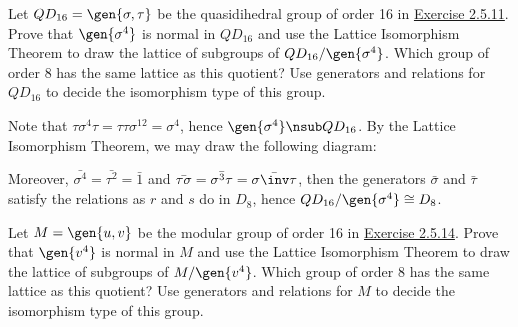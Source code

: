 \begin{exercise}\label{ex3.3.5}
    Let $QD_{16} = \gen{\sigma, \tau}$ be the quasidihedral group of order 16 in \hyperref[ex2.5.11]{Exercise 2.5.11}. Prove that $\gen{\sigma^4}$ is normal in $QD_{16}$ and use the Lattice Isomorphism Theorem to draw the lattice of subgroups of $QD_{16}/\gen{\sigma^4}$. Which group of order 8 has the same lattice as this quotient? Use generators and relations for $QD_{16}$ to decide the isomorphism type of this group.
\end{exercise}

\begin{sol}
    Note that $\tau\sigma^4\tau = \tau\tau\sigma^{12} = \sigma^4$, hence $\gen{\sigma^4} \nsub QD_{16}$. By the Lattice Isomorphism Theorem, we may draw the following diagram:
    \begin{center}
    \end{center}
    Moreover, $\bar{\sigma^4} = \bar{\tau^2} = \bar 1$ and $\bar{\tau\sigma} = \bar{\sigma^3\tau} = \bar{\sigma\inv\tau}$, then the generators $\bar\sigma$ and $\bar\tau$ satisfy the relations as $r$ and $s$ do in $D_8$, hence $QD_{16}/\gen{\sigma^4} \cong D_8$.
\end{sol}

\begin{exercise}\label{ex3.3.6}
    Let $M = \gen{u, v}$ be the modular group of order 16 in \hyperref[ex2.5.14]{Exercise 2.5.14}. Prove that $\gen{v^4}$ is normal in $M$ and use the Lattice Isomorphism Theorem to draw the lattice of subgroups of $M/\gen{v^4}$. Which group of order 8 has the same lattice as this quotient? Use generators and relations for $M$ to decide the isomorphism type of this group.
\end{exercise}

